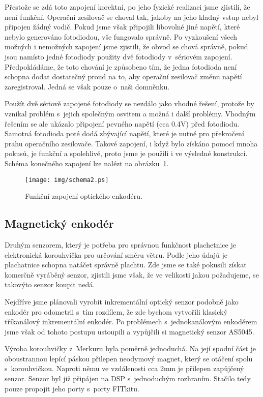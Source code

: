 Přestože se zdá toto zapojení korektní, po jeho fyzické realizaci jsme zjistili, že není funkční. Operační zesilovač se choval tak, jakoby na jeho kladný vstup nebyl připojen žádný vodič. Pokud jsme však připojili libovolné jiné napětí, které nebylo generováno fotodiodou, vše fungovalo správně. Po vyzkoušení všech možných i nemožných zapojení jsme zjistili, že obvod se chová správně, pokud jsou namísto jedné fotodiody použity dvě fotodiody v~sériovém zapojení. Předpokládáme, že toto chování je způsobeno tím, že jedna fotodioda není schopna dodat dostatečný proud na to, aby operační zesilovač změnu napětí zaregistroval. Jedná se však pouze o~naši domněnku.

Použít dvě sériově zapojené fotodiody se nezdálo jako vhodné řešení, protože by vznikal problém s~jejich společným osvitem a možná i další problémy. Vhodným řešením se ale ukázalo připojení pevného napětí (cca 0.4V) před fotodiodu. Samotná fotodioda poté dodá zbývající napětí, které je nutné pro překročení prahu operačního zesilovače. Takové zapojení, i když bylo získáno pomocí mnoha pokusů, je funkční a spolehlivé, proto jsme je použili i ve výsledné konstrukci. Schéma konečného zapojení lze nalézt na obrázku~\ref{fig:schema2}.

\begin{figure}[h]
\centering
\texttt{[image: img/schema2.ps]}
\caption{Funkční zapojení optického enkodéru.}
\label{fig:schema2}
\end{figure}

\subsection{Magnetický enkodér}
Druhým senzorem, který je potřeba pro správnou funkčnost plachetnice je elektronická korouhvička pro určování směru větru. Podle jeho údajů je plachatnice schopna natáčet správně plachtu. Zde jsme se také pokusili získat komerčně vyráběný senzor, zjistili jsme však, že ve velikosti jakou požadujeme, se takovýto senzor koupit nedá.

Nejdříve jsme plánovali vyrobit inkrementální optický senzor podobně jako enkodér pro odometrii s~tím rozdílem, že zde bychom vytvořili klasický tříkanálový inkrementální enkodér. Po problémech s~jednokanálovým enkodérem jsme však od tohoto postupu ustoupili a vypůjčili si magnetický senzor AS5045.

Výroba korouhvičky z~Merkuru byla poměrně jednoduchá. Na její spodní část je oboustrannou lepící páskou přilepen neodymový magnet, který se otáčení spolu s~korouhvičkou. Naproti němu ve vzdálenosti cca 2mm je přilepen zapůjčený senzor. Senzor byl již připájen na DSP s~jednoduchým rozhraním. Stačilo tedy pouze propojit jeho porty s~porty FITkitu.

